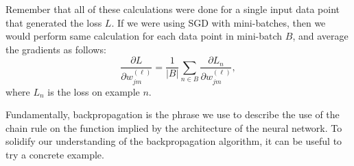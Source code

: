 Remember that all of these calculations were done for a single input data point that generated the loss $L$. If we were using SGD with  mini-batches, then we would perform  same calculation for each data point in mini-batch $B$, and average the gradients as follows:
%
\begin{equation} \label{batch-errors-backprop}
	\frac{\partial L}{\partial w^{(\ell)}_{jm}} = \frac{1}{|B|}\sum_{n\in B} \frac{\partial L_{n}}{\partial w^{(\ell)}_{jm}},
      \end{equation}
      where $L_n$ is the loss on example $n$.
     
Fundamentally, backpropagation is the phrase we use to describe the use of the chain rule on the function implied by the architecture of the neural network. To solidify our understanding of the backpropagation algorithm, it can be useful to try a concrete example.
%
